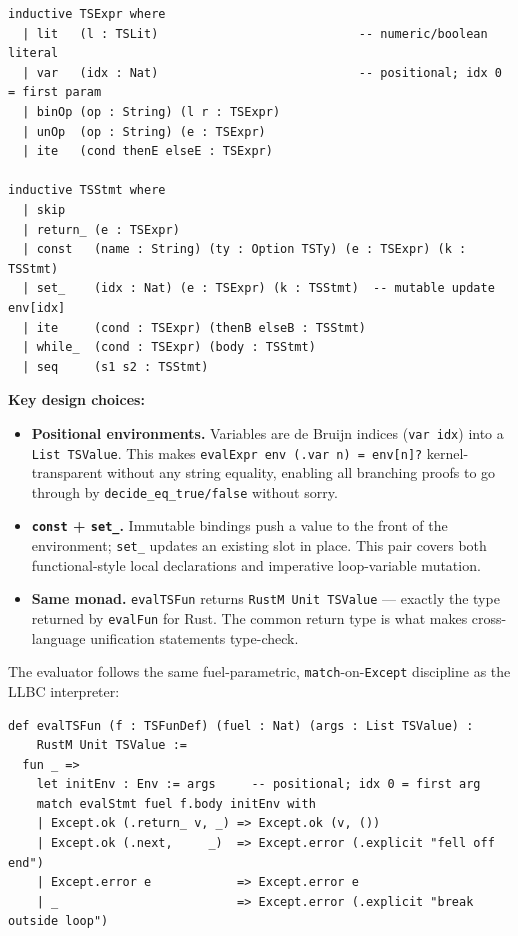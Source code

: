 \begin{lstlisting}[caption={TypeScript AST (actual definitions, selected).},
                   label={lst:tsast}]
inductive TSExpr where
  | lit   (l : TSLit)                            -- numeric/boolean literal
  | var   (idx : Nat)                            -- positional; idx 0 = first param
  | binOp (op : String) (l r : TSExpr)
  | unOp  (op : String) (e : TSExpr)
  | ite   (cond thenE elseE : TSExpr)

inductive TSStmt where
  | skip
  | return_ (e : TSExpr)
  | const   (name : String) (ty : Option TSTy) (e : TSExpr) (k : TSStmt)
  | set_    (idx : Nat) (e : TSExpr) (k : TSStmt)  -- mutable update env[idx]
  | ite     (cond : TSExpr) (thenB elseB : TSStmt)
  | while_  (cond : TSExpr) (body : TSStmt)
  | seq     (s1 s2 : TSStmt)
\end{lstlisting}

\noindent
\textbf{Key design choices:}
\begin{itemize}[leftmargin=2em]
  \item \textbf{Positional environments.} Variables are de Bruijn indices
        (\texttt{var idx}) into a \texttt{List TSValue}. This makes
        \texttt{evalExpr env (.var n) = env[n]?} kernel-transparent without
        any string equality, enabling all branching proofs to go through by
        \texttt{decide\_eq\_true/false} without sorry.

  \item \textbf{\texttt{const} + \texttt{set\_}.} Immutable bindings push a
        value to the front of the environment; \texttt{set\_} updates an existing
        slot in place. This pair covers both functional-style local declarations
        and imperative loop-variable mutation.

  \item \textbf{Same monad.} \texttt{evalTSFun} returns \texttt{RustM Unit TSValue}
        — exactly the type returned by \texttt{evalFun} for Rust. The common
        return type is what makes cross-language unification statements type-check.
\end{itemize}

The evaluator follows the same fuel-parametric, \texttt{match}-on-\texttt{Except}
discipline as the LLBC interpreter:

\begin{lstlisting}[caption={TypeScript evaluator entry point.},label={lst:tseval}]
def evalTSFun (f : TSFunDef) (fuel : Nat) (args : List TSValue) :
    RustM Unit TSValue :=
  fun _ =>
    let initEnv : Env := args     -- positional; idx 0 = first arg
    match evalStmt fuel f.body initEnv with
    | Except.ok (.return_ v, _) => Except.ok (v, ())
    | Except.ok (.next,     _)  => Except.error (.explicit "fell off end")
    | Except.error e            => Except.error e
    | _                         => Except.error (.explicit "break outside loop")
\end{lstlisting}

